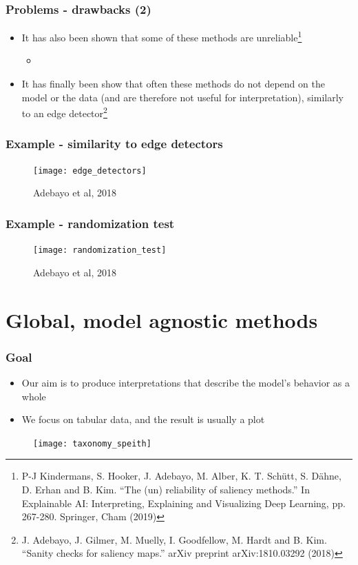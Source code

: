\begin{frame}
  \frametitle{Problems - drawbacks (2)}
  \begin{itemize}
  \item It has also been shown that some of these methods are unreliable\footnote{P-J Kindermans, S. Hooker, J. Adebayo, M. Alber,
    K. T. Sch\"{u}tt,  S. D\"{a}hne, D. Erhan and B. Kim. ``The (un)
    reliability of saliency methods.'' In Explainable AI: Interpreting,
    Explaining and Visualizing Deep Learning, pp. 267-280. Springer, Cham
    (2019)}
    \begin{itemize}
    \item {}
    \end{itemize}
  \item It has finally been show that often these methods do not depend on the
    model or the data (and are therefore not useful for interpretation), similarly to an edge
    detector\footnote{J. Adebayo, J. Gilmer, M. Muelly, I. Goodfellow, M. Hardt
    and B. Kim. ``Sanity checks for saliency maps.'' arXiv preprint
    arXiv:1810.03292 (2018)}
  \end{itemize}
\end{frame}


\begin{frame}
  \frametitle{Example - similarity to edge detectors}
  \begin{figure}
    \texttt{[image: edge\_detectors]}
    \caption{\footnotesize Adebayo et al, 2018}
  \end{figure}
\end{frame}

\begin{frame}
  \frametitle{Example - randomization test}
  \begin{figure}
    \texttt{[image: randomization\_test]}
    \caption{\footnotesize Adebayo et al, 2018}
  \end{figure}
\end{frame}

\section{Global, model agnostic methods}

\begin{frame}
  \frametitle{Goal}
  \begin{itemize}
  \item Our aim is to produce interpretations that describe the model's
    behavior as a whole 
  \item We focus on tabular data, and the result is usually a plot
  \end{itemize}
  \begin{figure}
    \texttt{[image: taxonomy\_speith]}
  \end{figure}
\end{frame}

